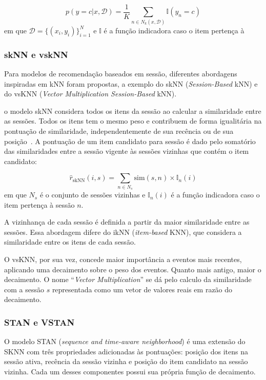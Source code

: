 \begin{equation}
    p(y=c|x, \mathcal{D}) = \frac{1}{K} \sum_{n \in N_k (x, \mathcal{D})} \mathbb{I}(y_n = c)
\end{equation}
em que $\mathcal{D} = \{(x_i, y_i )\}^{N}_{i=1}$ e $\mathbb{I}$ é a função
indicadora caso o item pertença à 

\subsubsection{skNN e vskNN}
Para modelos de recomendação baseados em sessão, diferentes abordagens inspiradas em kNN
foram propostas, a exemplo do skNN (\textit{Session-Based} kNN) e do vsKNN
(\textit{Vector Multiplication Session-Based} kNN).

o modelo skNN considera todos os itens da sessão ao calcular a similaridade
entre as sessões. Todos os itens tem o mesmo peso e contribuem de forma
igualitária na pontuação de similaridade, independentemente de sua
recência ou de sua posição~\cite{ludewig_2019}. A pontuação de um item candidato para sessão
é dado pelo somatório das similaridades entre a sessão vigente às sessões vizinhas
que contém o item candidato:

\begin{equation}
    \hat{r}_{\text{skNN}}(i, s) = \sum_{n \in N_s} \text{sim}(s,n) \times \mathbb{I}_n(i)
\end{equation}
em que $N_s$ é o conjunto de sessões vizinhas e $\mathbb{I}_n(i)$ é a função
indicadora caso o item pertença à sessão $n$.

A vizinhança de cada sessão é definida a partir da maior
similaridade entre as sessões. Essa abordagem difere do ikNN
(\textit{item-based} KNN), que considera a similaridade entre os itens de cada
sessão. 

O vsKNN, por sua vez, concede maior importância a eventos mais recentes,
aplicando uma decaimento sobre o peso dos eventos. Quanto mais antigo, maior o
decaimento. O nome ``\textit{Vector Multiplication}'' se dá pelo calculo da
similaridade com a sessão $s$ representada como um vetor de valores reais em
razão do decaimento.


\subsubsection{STAN e VSTAN}
O modelo STAN (\textit{sequence and time-aware neighborhood}) é uma extensão do
SKNN com três propriedades adicionadas às pontuações: posição dos itens na
sessão ativa, recência da sessão vizinha e posição do item candidato na sessão
vizinha. Cada um desses componentes possui sua própria função de decaimento.

